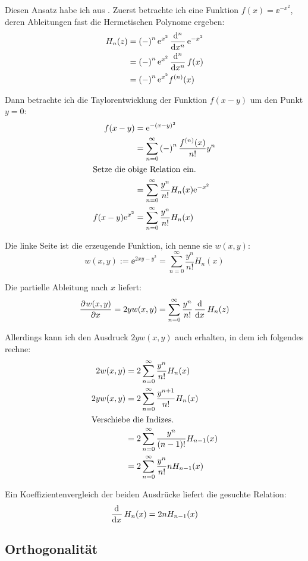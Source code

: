 Diesen Ansatz habe ich aus \cite[§§1,2,4]{koeppel-hermite_beiblatt}. Zuerst
betrachte ich eine Funktion $f(x) = \ee^{-x^2}$, deren Ableitungen fast die
Hermetischen Polynome ergeben:
\begin{align*}
	H_n(z)
	&= \del-^n \ee^{x^2} \dod[n]{}x \ee^{-x^2} \\
	&= \del-^n \ee^{x^2} \dod[n]{}x f(x) \\
	&= \del-^n \ee^{x^2} f^{(n)}(x)
\end{align*}

Dann betrachte ich die Taylorentwicklung der Funktion $f(x - y)$ um den Punkt
$y = 0$:
\begin{align*}
	f(x - y)
	&= \ee^{-(x-y)^2} \\
	&= \sum_{n=0}^\infty \del-^n \frac{f^{(n)}(x)}{n!} y^n \\
	\intertext{%
		Setze die obige Relation ein.
	}
	&= \sum_{n=0}^\infty \frac{y^n}{n!} H_n(x) \ee^{-x^2} \\
	f(x-y) \ee^{x^2} 
	&= \sum_{n=0}^\infty \frac{y^n}{n!} H_n(x)
\end{align*}

Die linke Seite ist die erzeugende Funktion, ich nenne sie $w(x, y)$:
\[
	w(x, y) := \ee^{2xy-y^2} = \sum_{n=0}^\infty \frac{y^n}{n!} H_n(x)
\]

Die partielle Ableitung nach $x$ liefert:
\[
	\dpd{w(x, y)}x = 2 y w(x, y)
	= \sum_{n=0}^\infty \frac{y^n}{n!} \dod{}x H_n(z)
\]

Allerdings kann ich den Ausdruck $2 y w(x, y)$ auch erhalten, in dem ich
folgendes rechne:
\begin{align*}
	2 w(x, y)
	&= 2 \sum_{n=0}^\infty \frac{y^n}{n!} H_n(x) \\
	2 y w(x, y)
	&= 2 \sum_{n=0}^\infty \frac{y^{n+1}}{n!} H_n(x) \\
	\intertext{%
		Verschiebe die Indizes.
	}
	&= 2 \sum_{n=0}^\infty \frac{y^{n}}{(n-1)!} H_{n-1}(x) \\
	&= 2 \sum_{n=0}^\infty \frac{y^{n}}{n!} n H_{n-1}(x)
\end{align*}

Ein Koeffizientenvergleich der beiden Ausdrücke liefert die gesuchte Relation:
\[
	\dod{}x H_n(x) = 2n H_{n-1}(x)
\]

\subsection{Orthogonalität}

